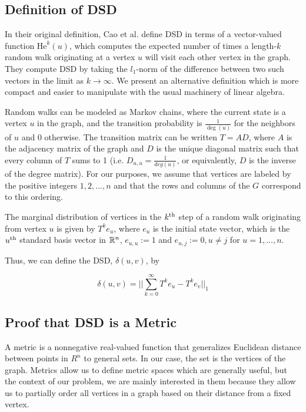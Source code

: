 \subsection*{Definition of DSD}

\noindent In their original definition, Cao et al. define DSD in terms of a
vector-valued function $\mathrm{He}^{k}(u)$, which computes the expected number of times
a length-$k$ random walk originating at a vertex $u$ will visit each other vertex
in the graph. They compute DSD by taking the $l_1$-norm of the difference
between two such vectors in the limit as $k \to \infty$. We present an
alternative definition which is more compact and easier to manipulate with the
usual machinery of linear algebra.

Random walks can be modeled as Markov chains, where the current state is a
vertex $u$ in the graph, and the transition probability is $\frac{1}{\deg(u)}$
for the neighbors of $u$ and $0$ otherwise. The transition matrix can be written
$T = AD$, where $A$ is the adjacency matrix of the graph and $D$ is the unique
diagonal matrix such that every column of $T$ sums to 1 (i.e.
$D_{u,u}=\frac{1}{deg(u)}$, or equivalently, $D$ is the inverse of the degree
matrix). For our purposes, we assume that vertices are labeled by the positive
integers $1,2,...,n$ and that the rows and columns of the $G$ correspond to this
ordering.

The marginal distribution of vertices in the $k^{\mathrm{th}}$ step of a random walk
originating from vertex $u$ is given by $T^ke_u$, where $e_u$ is the initial
state vector, which is the $u^{\mathrm{th}}$ standard basis vector in $\mathbb{R}^n$,
$e_{u,u} := 1$ and $e_{u,j} := 0, u \neq j$ for $u=1,...,n$.

Thus, we can define the DSD, $\delta(u,v)$, by

\[
  \delta(u,v) = ||\sum_{k =0}^{\infty}{T^ke_u - T^ke_v}||_1
\]

\subsection{Proof that DSD is a Metric}

A metric is a nonnegative real-valued function that generalizes Euclidean
distance between points in $R^n$ to general sets. In our case, the set is the
vertices of the graph. Metrics allow us to define metric spaces which are
generally useful, but the context of our problem, we are mainly interested in
them because they allow us to partially order all vertices in a graph based on
their distance from a fixed vertex.

